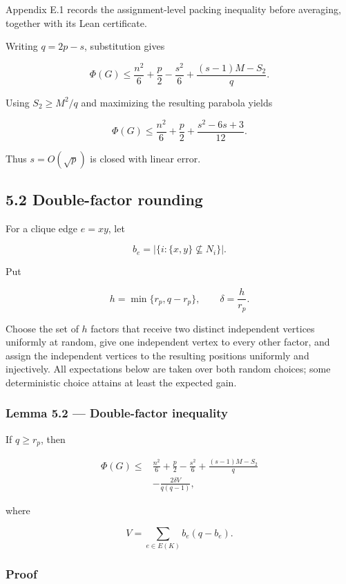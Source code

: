 \documentclass[
  american,
  11pt,
  a4paper,
]{article}
\begin{document}
Appendix E.1 records the assignment-level packing inequality before averaging, together with its Lean certificate.

Writing \(q=2p-s\), substitution gives

\[
\Phi(G)
\le
\frac{n^2}{6}+\frac p2-\frac{s^2}{6}
+
\frac{(s-1)M-S_2}{q}.
\tag{5.2}
\]

Using \(S_2\ge M^2/q\) and maximizing the resulting parabola yields

\[
\boxed{
\Phi(G)
\le
\frac{n^2}{6}+\frac p2+\frac{s^2-6s+3}{12}.
}
\tag{5.3}
\]

Thus \(s=O(\sqrt p)\) is closed with linear error.

\subsection{5.2 Double-factor rounding}\label{double-factor-rounding}

For a clique edge \(e=xy\), let

\[
b_e=|\{i:\{x,y\}\not\subseteq N_i\}|.
\]

Put

\[
h=\min\{r_p,q-r_p\},
\qquad
\delta=\frac h{r_p}.
\]

Choose the set of \(h\) factors that receive two distinct independent vertices uniformly at random, give one independent vertex to every other factor, and assign the independent vertices to the resulting positions uniformly and injectively. All expectations below are taken over both random choices; some deterministic choice attains at least the expected gain.

\subsubsection{Lemma 5.2 --- Double-factor inequality}\label{lemma-5.2-double-factor-inequality}

If \(q\ge r_p\), then

\[
\boxed{
\begin{aligned}
\Phi(G)
\le{}&
\frac{n^2}{6}+\frac p2-\frac{s^2}{6}
+
\frac{(s-1)M-S_2}{q}\\
&-
\frac{2\delta V}{q(q-1)},
\end{aligned}
}
\tag{5.4}
\]

where

\[
V=\sum_{e\in E(K)}b_e(q-b_e).
\tag{5.5}
\]

\subsubsection{Proof}\label{proof-4}
\end{document}
